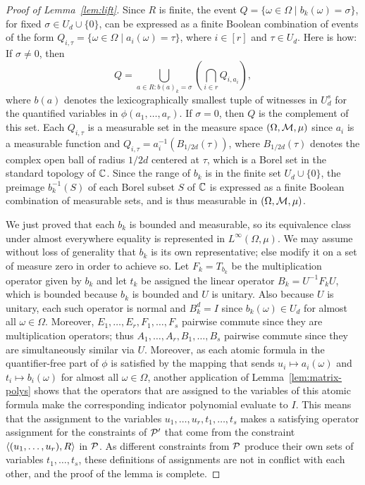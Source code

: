 \begin{proof}[Proof of Lemma~\ref{lem:lift}]
Since $R$ is finite, the event $Q = \{\omega\in\Omega\mid b_k(\omega) =\sigma\}$, for fixed $\sigma\in U_d\cup\{0\}$, can be expressed as a finite Boolean
combination of events of the form $Q_{i,\tau} = \{\omega\in\Omega\mid a_i(\omega) = \tau\}$, where $i\in[r]$ and $\tau\in U_d$. Here is how: If $\sigma\ne0$, then
\[
Q=\bigcup_{a\in R:b(a)_k=\sigma}\left(\bigcap_{i\in r} Q_{i,a_i}\right),
\]
where $b(a)$ denotes the lexicographically smallest tuple of witnesses in $U_d^s$ for the quantified variables in $\phi(a_1,\dots,a_r)$. If $\sigma = 0$, then $Q$ is the complement of this set. Each $Q_{i,\tau}$ is a measurable set in the measure space $(\Omega,{\mathcal M},\mu)$ since
$a_i$ is a measurable function and $Q_{i,\tau} = a^{-1}_i(B_{1/2d}(\tau))$, where $B_{1/2d}(\tau)$ denotes the complex open ball of radius $1/2d$ centered
at $\tau$, which is a Borel set in the standard topology of ${\mathbb C}$. Since the range of $b_k$ is in the finite set $U_d\cup\{0\}$, the preimage
$b^{-1}_k(S)$ of each Borel subset $S$ of ${\mathbb C}$ is expressed as a finite Boolean combination of measurable sets, and is thus measurable
in $(\Omega,{\mathcal M},\mu)$.

We just proved that each $b_k$ is bounded and measurable, so its equivalence class under almost everywhere equality
is represented in $L^\infty(\Omega,\mu)$. We may assume without loss of generality that $b_k$ is its own representative; else modify it
on a set of measure zero in order to achieve so. Let $F_k = T_{b_k}$ be the multiplication operator given by $b_k$ and let $t_k$ be
assigned the linear operator $B_k = U^{-1} F_kU$, which is bounded because $b_k$ is bounded and $U$ is unitary. Also because $U$
is unitary, each such operator is normal and $B_k^d=I$ since $b_k(\omega)\in U_d$ for almost all $\omega\in\Omega$. Moreover, $E_1,\dots, E_r, F_1,\dots, F_s$ pairwise commute since they are multiplication operators; thus $A_1,\dots, A_r, B_1,\dots, B_s$ pairwise
commute since they are simultaneously similar via $U$. Moreover, as each atomic formula in the quantifier-free part of $\phi$
is satisfied by the mapping that sends $u_i\mapsto a_i(\omega)$ and $t_i\mapsto b_i(\omega)$ for almost all $\omega\in\Omega$, another application of Lemma~\ref{lem:matrix-polys}
shows that the operators that are assigned to the variables of this atomic formula make the corresponding indicator polynomial evaluate to $I$. This means that the assignment to the variables $u_1,\dots, u_r,t_1,\dots,t_s$ makes a satisfying operator assignment for
the constraints of ${\mathcal P}'$ that come from the constraint $\langle (u_1,\dots, u_r), R \rangle$ in ${\mathcal P}$. As different constraints from ${\mathcal P}$ produce their own sets of
variables $t_1,\dots,t_s$, these definitions of assignments are not in conflict with each other, and the proof of the lemma is complete.


\end{proof}
